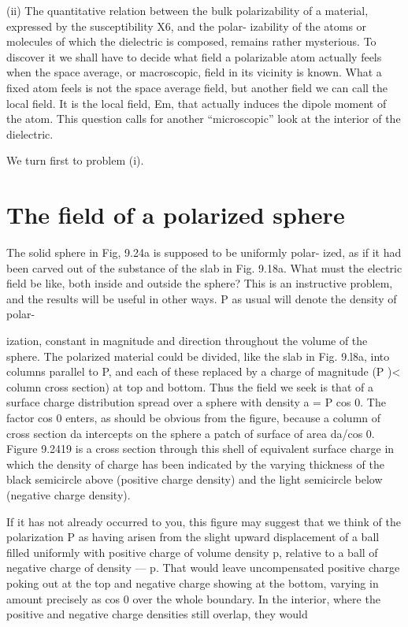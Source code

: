 (ii) The quantitative relation between the bulk polarizability of
a material, expressed by the susceptibility X6, and the polar-
izability of the atoms or molecules of which the dielectric
is composed, remains rather mysterious. To discover it
we shall have to decide what field a polarizable atom
actually feels when the space average, or macroscopic, field
in its vicinity is known. What a fixed atom feels is not the
space average field, but another field we can call the local
field. It is the local field, Em, that actually induces the
dipole moment of the atom. This question calls for another
``microscopic'' look at the interior of the dielectric.

We turn first to problem (i).

\section{The field of a polarized sphere}

The solid sphere in Fig, 9.24a is supposed to be uniformly polar-
ized, as if it had been carved out of the substance of the slab in
Fig. 9.18a. What must the electric field be like, both inside and outside
the sphere? This is an instructive problem, and the results will
be useful in other ways. P as usual will denote the density of polar-

ization, constant in magnitude and direction throughout the volume
of the sphere. The polarized material could be divided, like the slab
in Fig. 9.l8a, into columns parallel to P, and each of these replaced
by a charge of magnitude (P )< column cross section) at top and
bottom. Thus the field we seek is that of a surface charge distribution
spread over a sphere with density a = P cos 0. The factor cos 0
enters, as should be obvious from the figure, because a column of
cross section da intercepts on the sphere a patch of surface of area
da/cos 0. Figure 9.2419 is a cross section through this shell of equivalent
surface charge in which the density of charge has been indicated
by the varying thickness of the black semicircle above (positive
charge density) and the light semicircle below (negative charge
density).

If it has not already occurred to you, this figure may suggest that
we think of the polarization P as having arisen from the slight upward
displacement of a ball filled uniformly with positive charge of
volume density p, relative to a ball of negative charge of density  --- p.
That would leave uncompensated positive charge poking out at the
top and negative charge showing at the bottom, varying in amount
precisely as cos 0 over the whole boundary. In the interior, where
the positive and negative charge densities still overlap, they would

